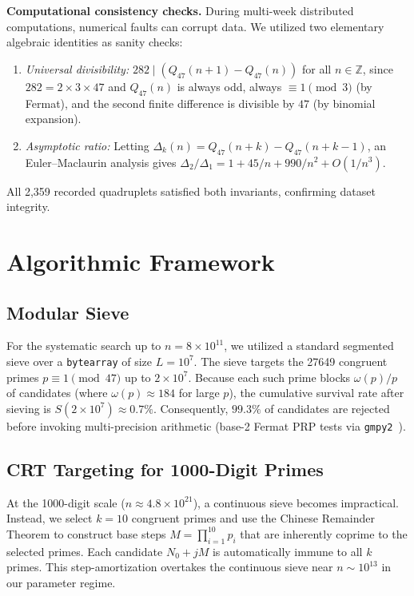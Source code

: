\documentclass[11pt, a4paper]{article}
\begin{document}
\textbf{Computational consistency checks.}\; During multi-week distributed computations, numerical faults can corrupt data. We utilized two elementary algebraic identities as sanity checks:
\begin{enumerate}
\item \textit{Universal divisibility:} $282 \mid (Q_{47}(n+1)-Q_{47}(n))$ for all $n \in \mathbb{Z}$, since $282 = 2 \times 3 \times 47$ and $Q_{47}(n)$ is always odd, always $\equiv 1 \pmod{3}$ (by Fermat), and the second finite difference is divisible by $47$ (by binomial expansion).
\item \textit{Asymptotic ratio:} Letting $\Delta_k(n) = Q_{47}(n+k) - Q_{47}(n+k-1)$, an Euler--Maclaurin analysis gives $\Delta_2/\Delta_1 = 1 + 45/n + 990/n^2 + O(1/n^3)$.
\end{enumerate}
All 2{,}359 recorded quadruplets satisfied both invariants, confirming dataset integrity.

\section{Algorithmic Framework}\label{sec:method}

\subsection{Modular Sieve}
For the systematic search up to $n = 8 \times 10^{11}$, we utilized a standard segmented sieve over a \texttt{bytearray} of size $L = 10^{7}$. The sieve targets the \num{27649} congruent primes $p \equiv 1 \pmod{47}$ up to $2 \times 10^{7}$. Because each such prime blocks $\omega(p)/p$ of candidates (where $\omega(p) \approx 184$ for large $p$), the cumulative survival rate after sieving is $S(2 \times 10^{7}) \approx 0.7\%$. Consequently, $99.3\%$ of candidates are rejected before invoking multi-precision arithmetic (base-2 Fermat PRP tests via \texttt{gmpy2}~\cite{gmpy2}).

\subsection{CRT Targeting for 1000-Digit Primes}\label{sec:crt}
At the 1000-digit scale ($n \approx 4.8 \times 10^{21}$), a continuous sieve becomes impractical. Instead, we select $k = 10$ congruent primes and use the Chinese Remainder Theorem to construct base steps $M = \prod_{i=1}^{10} p_{i}$ that are inherently coprime to the selected primes. Each candidate $N_0 + jM$ is automatically immune to all $k$ primes. This step-amortization overtakes the continuous sieve near $n \sim 10^{13}$ in our parameter regime.
\end{document}
